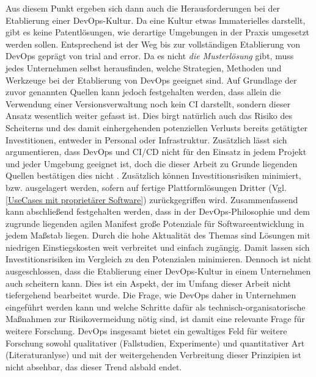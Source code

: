 Aus diesem Punkt ergeben sich dann auch die Herausforderungen bei der Etablierung einer \acrshort{DevOps}-Kultur. Da eine Kultur etwas Immaterielles darstellt, gibt es keine Patentlösungen, wie derartige Umgebungen in der Praxis umgesetzt werden sollen.
Entsprechend ist der Weg bis zur vollständigen Etablierung von \gls{DevOps} geprägt von \glqq{}trial and error\grqq{}. Da es nicht \textit{die Musterlösung} gibt, muss jedes Unternehmen selbst herausfinden, welche Strategien, Methoden und Werkzeuge bei der Etablierung von \gls{DevOps} geeignet sind. Auf Grundlage der zuvor genannten Quellen kann jedoch festgehalten werden, dass allein die Verwendung einer Versionsverwaltung noch kein \acrshort{CI} darstellt, sondern dieser Ansatz wesentlich weiter gefasst ist. Dies birgt natürlich auch das Risiko des Scheiterns und des damit einhergehenden potenziellen Verlusts bereits getätigter Investitionen, entweder in Personal oder Infrastruktur. Zusätzlich lässt sich argumentieren, dass \gls{DevOps} und \acrshort{CI}/\acrshort{CD} nicht für den Einsatz in jedem Projekt und jeder Umgebung geeignet ist, doch die dieser Arbeit zu Grunde liegenden Quellen bestätigen dies nicht \cite[Abb. 2 und 3]{hilton_usage_2016}. Zusätzlich können Investitionsrisiken minimiert, bzw. ausgelagert werden, sofern auf fertige Plattformlösungen Dritter (Vgl. \ref{UseCases mit proprietärer Software}) zurückgegriffen wird.\newline
Zusammenfassend kann abschließend festgehalten werden, dass in der \gls{DevOps}-Philosophie und dem zugrunde liegenden agilen Manifest \cite{beck_manifest_2001} große Potenziale für Softwareentwicklung in jedem Maßstab liegen. Durch die hohe Aktualität des Themas sind Lösungen mit niedrigen Einstiegskosten weit verbreitet und einfach zugängig. Damit lassen sich Investitionsrisiken im Vergleich zu den Potenzialen minimieren. Dennoch ist nicht ausgeschlossen, dass die Etablierung einer \acrshort{DevOps}-Kultur in einem Unternehmen auch scheitern kann. Dies ist ein Aspekt, der im Umfang dieser Arbeit nicht tiefergehend bearbeitet wurde.
Die Frage, wie \gls{DevOps} daher in Unternehmen eingeführt werden kann und welche Schritte dafür als technisch-organisatorische Maßnahmen zur Risikovermeidung nötig sind, ist damit eine relevante Frage für weitere Forschung. \gls{DevOps} insgesamt bietet ein gewaltiges Feld für weitere Forschung sowohl qualitativer (Fallstudien, Experimente) und quantitativer Art (Literaturanlyse) und mit der weitergehenden Verbreitung dieser Prinzipien ist nicht absehbar, das dieser Trend alsbald endet.